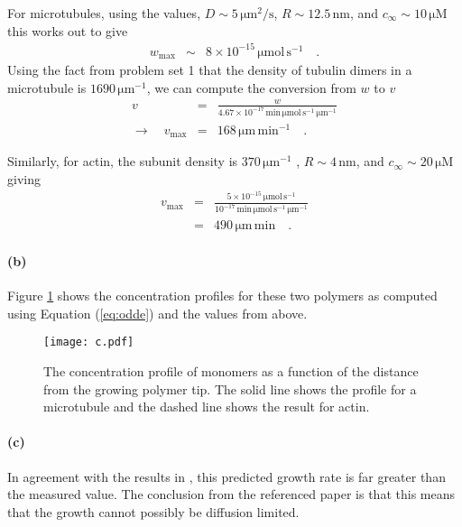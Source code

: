 \documentclass[12pt]{article}
\newcommand{\eq}[1]{Equation (\ref{eq:#1})}
\newcommand{\Fig}[1]{Figure \ref{fig:#1}}
\newcommand{\figlabel}[1]{\label{fig:#1}}
\begin{document}
For microtubules, using the values, $D \sim 5\,\mathrm{\mu m^2/s}$,
$R \sim 12.5\,\mathrm{nm}$, and $c_\infty \sim 10\,\mathrm{\mu M}$ this works
out to give
\begin{eqnarray}
w_\mathrm{max} &\sim& 8 \times 10^{-15} \, \mathrm{\mu mol\,s^{-1}} \quad.
\end{eqnarray}
Using the fact from problem set 1 that the density of tubulin dimers in a
microtubule is $1690\,\mathrm{\mu m^{-1}}$, we can compute the conversion from
$w$ to $v$
\begin{eqnarray}
v &=& \frac{w}{4.67\times10^{-17} \, \mathrm{min\,\mu mol\,s^{-1}\,\mu
        m^{-1}}} \\
\to \quad v_\mathrm{max} &=& 168 \, \mathrm{\mu m \, min^{-1}} \quad.
\end{eqnarray}

Similarly, for actin, the subunit density is $370\,\mathrm{\mu m^{-1}}$
\cite{pollard}, $R\sim 4\,\mathrm{nm}$, and $c_\infty \sim 20\,\mathrm{\mu
M}$ giving
\begin{eqnarray}
v_\mathrm{max} &=& \frac{5\times10^{-15} \, \mathrm{\mu mol\, s^{-1}}}
            {10^{-17} \, \mathrm{min\,\mu mol\,s^{-1}\,\mu m^{-1}}} \\
&=& 490 \, \mathrm{\mu m \, min} \quad.
\end{eqnarray}

\paragraph{(b)}

\Fig{concent} shows the concentration profiles for these two polymers as
computed using \eq{odde} and the values from above.

\begin{figure}[htbp]
\begin{center}
\texttt{[image: c.pdf]}
\end{center}
\caption{%
The concentration profile of monomers as a function of the distance from the
growing polymer tip. The solid line shows the profile for a microtubule and
the dashed line shows the result for actin.
\figlabel{concent}}
\end{figure}

\paragraph{(c)}

In agreement with the results in \cite{odde}, this predicted growth rate is
far greater than the measured value.
The conclusion from the referenced paper is that this means that the growth
cannot possibly be diffusion limited.
\end{document}
